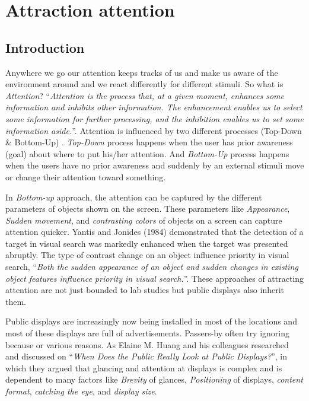 
\chapter{Attraction attention} %

\label{Chapter3} %
\newpage

\section{Introduction}

Anywhere we go our attention keeps tracks of us and make us aware of the environment around and we react differently for different stimuli. So what is \emph{Attention}? ``\emph{Attention is the process that, at a given moment, enhances some information and inhibits other information. The enhancement enables us to select some information for further processing, and the inhibition enables us to set some information aside.}''\cite{Attention}. Attention is influenced by two different processes (Top-Down \& Bottom-Up) \cite{attention1,Attention}. \emph{Top-Down} process happens when the user has prior awareness (goal) about where to put his/her attention. And \emph{Bottom-Up} process happens when the users have no prior awareness and suddenly by an external stimuli move or change their attention toward something. 

In \emph{Bottom-up} approach, the attention can be captured by the different parameters of objects shown on the screen. These parameters like \emph{Appearance}, \emph{Sudden movement}, and \emph{contrasting colors} of objects on a screen can capture attention quicker. Yantis and Jonides (1984) demonstrated that the detection of a target in visual search was markedly enhanced when the target was presented abruptly\cite{capturingattention}. The type of contrast change on an object influence priority in visual search, ``\emph{Both the sudden appearance of an object and sudden changes in existing object features influence priority in visual search.}''\cite{Luminance}. These approaches of attracting attention are not just bounded to lab studies but public displays also inherit them. 

Public displays are increasingly now being installed in most of the locations and most of these displays are full of advertisements. Passers-by often try ignoring because or various reasons. As Elaine M. Huang and his colleagues researched and discussed on ``\emph{When Does the Public Really Look at Public Displays?}''\cite{WhenPublicDisplays}, in which they argued that glancing and attention at displays is complex and is dependent to many factors like \emph{Brevity} of glances, \emph{Positioning} of displays, \emph{content format}, \emph{catching the eye}, and \emph{display size}. 

